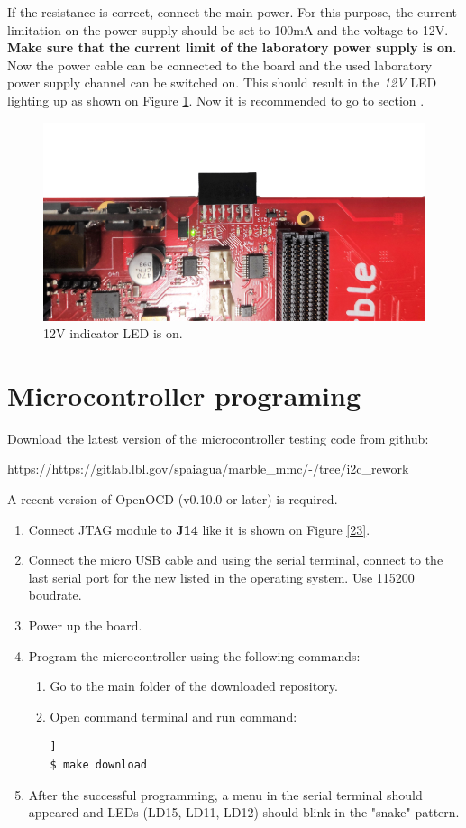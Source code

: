 \documentclass[12pt,oneside,a4]{article}
\begin{document}
If the resistance is correct, connect the main power. For this purpose, the current limitation on the power supply should be set to 100mA and the voltage to 12V. \textbf{Make sure that the current limit of the laboratory power supply is on.} Now the power cable can be connected to the board and the used laboratory power supply channel can be switched on. 
This should result in the \textit{12V} LED lighting up as shown  on Figure \ref{02}. Now it is recommended to go to section . 
\begin{figure}[H]
\begin{center}
\includegraphics[width=0.8\linewidth, angle = 180]{xrpoff.png}
 \caption{12V indicator LED is on. }\label{02}
\end{center}
\end{figure}

\section{Microcontroller programing}
\label{microcontroller}

Download the latest version of the microcontroller testing code from github:
\begin{leftbar}
https://https://gitlab.lbl.gov/spaiagua/marble\_mmc/-/tree/i2c\_rework
\end{leftbar}

A recent version of OpenOCD (v0.10.0 or later) is required. 
\begin{enumerate}
	\item Connect JTAG module to \textbf{J14} like it is shown on Figure \ref{23}.
	\item Connect the micro USB cable and using the serial terminal, connect to the last serial port for the new listed in the operating system. Use 115200 boudrate.
	\item Power up the board.
	\item Program the microcontroller using the following commands:
	\begin{enumerate}
	\item Go to the main folder of the downloaded repository.
	\item Open command terminal and run command:
	\begin{lstlisting}[backgroundcolor = \color{Gainsboro}, language=bash, frame=none]]
$ make download
	\end{lstlisting}
	\end{enumerate}
	\item After the successful programming, a menu in the serial terminal should appeared and LEDs (LD15, LD11, LD12) should blink in the "snake" pattern.
\end{enumerate}
\end{document}
